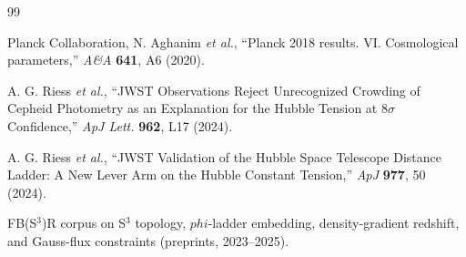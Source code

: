 \documentclass[
  onecolumn,
  amsmath,amssymb,
  aps,
  prd,
  superscriptaddress,
  nofootinbib,
  longbibliography
]{revtex4-2}
\newcommand{\vp}{\varphi}
\def\varphi{phi}%
\begin{document}

\begin{thebibliography}{99}

Planck Collaboration, N. Aghanim \textit{et al.}, 
``Planck 2018 results. VI. Cosmological parameters,'' 
\textit{A\&A} \textbf{641}, A6 (2020).

A. G. Riess \textit{et al.}, 
``JWST Observations Reject Unrecognized Crowding of Cepheid Photometry as an Explanation for the Hubble Tension at 8$\sigma$ Confidence,'' 
\textit{ApJ Lett.} \textbf{962}, L17 (2024).

A. G. Riess \textit{et al.}, 
``JWST Validation of the Hubble Space Telescope Distance Ladder: A New Lever Arm on the Hubble Constant Tension,'' 
\textit{ApJ} \textbf{977}, 50 (2024).

FB(S$^3$)R corpus on S$^3$ topology, $\vp$-ladder embedding, density-gradient redshift, and Gauss-flux constraints (preprints, 2023--2025).

\end{thebibliography}
\end{document}
